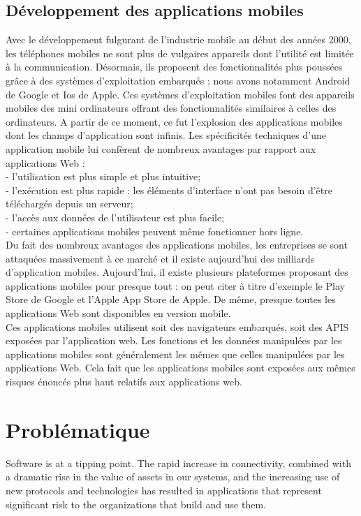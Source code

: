 \subsection{Développement des applications mobiles}
Avec le développement fulgurant de l'industrie mobile au début des années 2000, les téléphones mobiles ne sont plus de vulgaires appareils dont l'utilité est limitée à la communication. Désormais, ils proposent des fonctionnalités plus poussées grâce à des systèmes d'exploitation embarqués ; nous avons notamment Android de Google et Ios de Apple. Ces systèmes d'exploitation mobiles font des appareils mobiles des mini ordinateurs offrant des fonctionnalités similaires à celles des ordinateurs. A partir de ce moment, ce fut l'explosion des applications mobiles dont les champs d'application sont infinis.
Les spécificités techniques d’une application mobile lui confèrent de nombreux avantages par rapport aux applications Web :\\
- l'utilisation est plus simple et plus intuitive; \\
- l’exécution est plus rapide : les éléments d’interface n’ont pas besoin d’être téléchargés depuis un serveur; \\
- l’accès aux données de l’utilisateur est plus facile; \\
- certaines applications mobiles peuvent même fonctionner hors ligne.\\
Du fait des nombreux avantages des applications mobiles, les entreprises se sont attaquées massivement à ce marché et il existe aujourd'hui des milliards d'application mobiles. Aujourd'hui, il existe plusieurs plateformes proposant des applications mobiles pour presque tout : on peut citer à titre d'exemple le Play Store de Google et l'Apple App Store de Apple. De même, presque toutes les applications Web sont disponibles en version mobile. \\
Ces applications mobiles utilisent soit des navigateurs embarqués, soit des APIS exposées par l’application web. Les fonctions et les données manipulées par les applications mobiles sont généralement les mêmes que celles manipulées par les applications Web. Cela fait que les applications mobiles sont exposées aux mêmes risques énoncés plus haut relatifs aux applications web.\\

\section{Problématique}
Software is at a tipping point. The rapid increase in connectivity, combined with a dramatic rise in the value of assets in our systems, and the increasing use of new protocols and technologies has resulted in applications that represent significant risk to the organizations that build and use them. 

